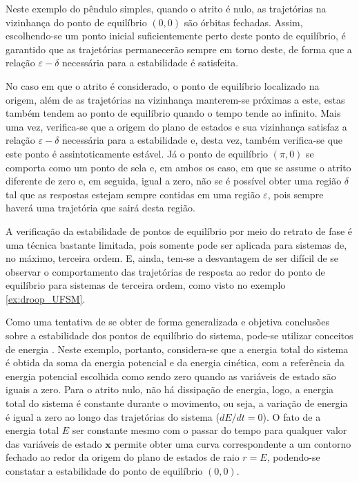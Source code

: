 Neste exemplo do pêndulo simples, quando o atrito é nulo, as trajetórias na vizinhança do ponto de equilíbrio $(0,0)$ são órbitas fechadas. Assim, escolhendo-se um ponto inicial suficientemente perto deste ponto de equilíbrio, é garantido que as trajetórias permanecerão sempre em torno deste, de forma que a relação $\varepsilon-\delta$ necessária para a estabilidade é satisfeita.

No caso em que o atrito é considerado, o ponto de equilíbrio localizado na origem, além de as trajetórias na vizinhança manterem-se próximas a este, estas também tendem ao ponto de equilíbrio quando o tempo tende ao infinito. Mais uma vez, verifica-se que  a origem do plano de estados e sua vizinhança satisfaz a relação $\varepsilon-\delta$ necessária para a estabilidade e, desta vez, também verifica-se que este ponto é assintoticamente estável. Já o ponto de equilíbrio $(\pi, 0)$ se comporta como um ponto de sela e, em ambos os caso, em que se assume o atrito diferente de zero e, em seguida, igual a zero, não se é possível obter uma região $\delta$ tal que as respostas estejam sempre contidas em uma região $\varepsilon$, pois sempre haverá uma trajetória que sairá desta região.

A verificação da estabilidade de pontos de equilíbrio por meio do retrato de fase é uma técnica bastante limitada, pois somente pode ser aplicada para sistemas de, no máximo, terceira ordem. E, ainda, tem-se a desvantagem de ser difícil de se observar o comportamento das trajetórias de resposta ao redor do ponto de equilíbrio para sistemas de terceira ordem, como visto no exemplo \ref{ex:droop_UFSM}.

Como uma tentativa de se obter de forma generalizada e objetiva conclusões sobre a estabilidade dos pontos de equilíbrio do sistema, pode-se utilizar conceitos de energia \cite{bookkhalil:2003}. Neste exemplo, portanto, considera-se que a energia total do sistema é obtida da soma da energia potencial e da energia cinética, com a referência da energia potencial escolhida como sendo zero quando as variáveis de estado são iguais a zero. Para o atrito nulo, não há dissipação de energia, logo, a energia total do sistema é constante durante o movimento, ou seja, a variação de energia é igual a zero ao longo das trajetórias do sistema ($dE/dt = 0$). O fato de a energia total $E$ ser constante mesmo com o passar do tempo para qualquer valor das variáveis de estado $\textbf{x}$ permite obter uma curva correspondente a um contorno fechado ao redor da origem do plano de estados de raio $r = E$, podendo-se constatar a estabilidade do ponto de equilíbrio $(0,0)$.

